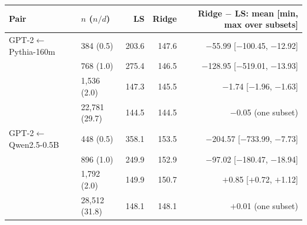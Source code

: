 \begin{tabular}{llrrr}
\toprule
Pair & $n$ ($n/d$) & LS & Ridge & Ridge $-$ LS: mean [min, max over subsets] \\
\midrule
GPT-2$\leftarrow$Pythia-160m & 384 (0.5) & 203.6 & 147.6 & $-$55.99 [$-$100.45, $-$12.92] \\
 & 768 (1.0) & 275.4 & 146.5 & $-$128.95 [$-$519.01, $-$13.93] \\
 & 1,536 (2.0) & 147.3 & 145.5 & $-$1.74 [$-$1.96, $-$1.63] \\
 & 22,781 (29.7) & 144.5 & 144.5 & $-$0.05 (one subset) \\
\midrule
GPT-2$\leftarrow$Qwen2.5-0.5B & 448 (0.5) & 358.1 & 153.5 & $-$204.57 [$-$733.99, $-$7.73] \\
 & 896 (1.0) & 249.9 & 152.9 & $-$97.02 [$-$180.47, $-$18.94] \\
 & 1,792 (2.0) & 149.9 & 150.7 & $+$0.85 [$+$0.72, $+$1.12] \\
 & 28,512 (31.8) & 148.1 & 148.1 & $+$0.01 (one subset) \\
\bottomrule
\end{tabular}
